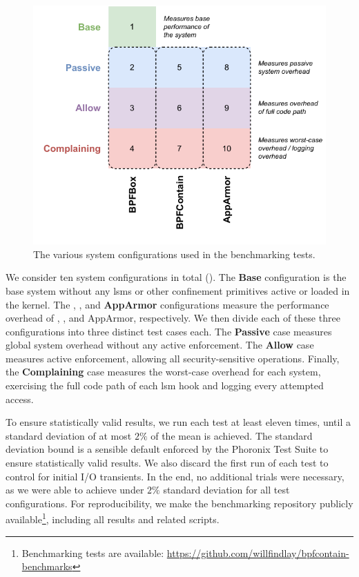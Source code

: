 \begin{figure}[htp]
  \centering
  \includegraphics[width=0.8\linewidth]{figs/eval/configuration.pdf}
  \caption[Benchmarking system configurations]{
    The various system configurations used in the benchmarking tests.
  }%
  \label{fig:configuration}
\end{figure}

We consider ten system configurations in total (). The
\textbf{Base} configuration is the base system without any \glspl{lsm} or other
confinement primitives active or loaded in the kernel. The \textbf{\bpfbox},
\textbf{\bpfcontain}, and \textbf{AppArmor} configurations measure the performance
overhead of \bpfbox{}, \bpfcontain{}, and AppArmor, respectively. We then divide each of
these three configurations into three distinct test cases each. The \textbf{Passive} case
measures global system overhead without any active enforcement. The \textbf{Allow} case
measures active enforcement, allowing all security-sensitive operations. Finally, the
\textbf{Complaining} case measures the worst-case overhead for each system, exercising the
full code path of each \gls{lsm} hook and logging every attempted access.

To ensure statistically valid results, we run each test at least eleven times, until
a standard deviation of at most $2\%$ of the mean is achieved. The standard deviation
bound is a sensible default enforced by the Phoronix Test Suite to ensure statistically
valid results. We also discard the first run of each test to control for initial I/O
transients. In the end, no additional trials were necessary, as we were able to achieve
under $2\%$ standard deviation for all test configurations. For reproducibility, we make
the benchmarking repository publicly available\footnote{Benchmarking tests are available:
\url{https://github.com/willfindlay/bpfcontain-benchmarks}}, including all results and
related scripts.

